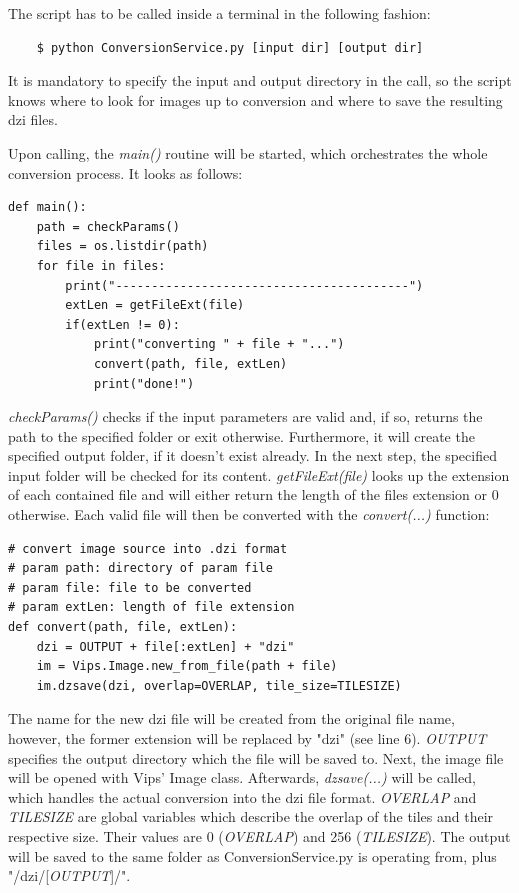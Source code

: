 The script has to be called inside a terminal in the following fashion:

\begin{lstlisting}
	$ python ConversionService.py [input dir] [output dir]
\end{lstlisting}

It is mandatory to specify the input and output directory in the call, so the script knows where to look for images up to conversion and where to save the resulting dzi files.

Upon calling, the \emph{main()} routine will be started, which orchestrates the whole conversion process. It looks as follows:

\begin{lstlisting}[frame=single]
def main():
	path = checkParams()
	files = os.listdir(path)
	for file in files:
		print("-----------------------------------------")
		extLen = getFileExt(file)
		if(extLen != 0):
			print("converting " + file + "...")
			convert(path, file, extLen)
			print("done!")
\end{lstlisting}

\emph{checkParams()} checks if the input parameters are valid and, if so, returns the path to the specified folder or exit otherwise. Furthermore, it will create the specified output folder, if it doesn't exist already. In the next step, the specified input folder will be checked for its content. \emph{getFileExt(file)} looks up the extension of each contained file and will either return the length of the files extension or $0$ otherwise. Each valid file will then be converted with the \emph{convert(...)} function:

\begin{lstlisting}[frame=single]
# convert image source into .dzi format
# param path: directory of param file
# param file: file to be converted
# param extLen: length of file extension
def convert(path, file, extLen):
	dzi = OUTPUT + file[:extLen] + "dzi"
	im = Vips.Image.new_from_file(path + file)
	im.dzsave(dzi, overlap=OVERLAP, tile_size=TILESIZE)
\end{lstlisting}

The name for the new dzi file will be created from the original file name, however, the former extension will be replaced by "dzi" (see line 6). \emph{OUTPUT} specifies the output directory which the file will be saved to. Next, the image file will be opened with Vips' Image class. Afterwards, \emph{dzsave(...)} will be called, which handles the actual conversion into the dzi file format. \emph{OVERLAP} and \emph{TILESIZE} are global variables which describe the overlap of the tiles and their respective size. Their values are 0 (\emph{OVERLAP}) and 256 (\emph{TILESIZE}). The output will be saved to the same folder as ConversionService.py is operating from, plus "/dzi/[\emph{OUTPUT}]/".


